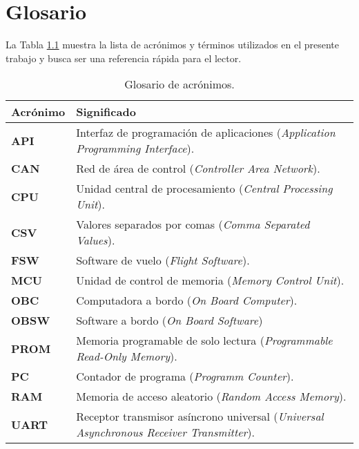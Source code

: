 
\chapter{Glosario} %
\label{AppendixA} %

La Tabla \ref{tab:glosario} muestra la lista de acrónimos y términos utilizados en el presente trabajo y busca ser una referencia rápida para el lector.


\begin{table}[h]
	\centering
	\caption[Tipos de emuladores]{Glosario de acrónimos.}
	\begin{tabular}{p{} p{}}
		\toprule
		\textbf{Acrónimo} & \textbf{Significado} \\
		\midrule
    \textbf{API} & Interfaz de programación de aplicaciones (\textit{Application Programming Interface}). \\
    \textbf{CAN} & Red de área de control (\textit{Controller Area Network}). \\
    \textbf{CPU} & Unidad central de procesamiento (\textit{Central Processing Unit}). \\
    \textbf{CSV} & Valores separados por comas (\textit{Comma Separated Values}). \\
    \textbf{FSW} & Software de vuelo (\textit{Flight Software}). \\
    \textbf{MCU} & Unidad de control de memoria (\textit{Memory Control Unit}). \\
    \textbf{OBC} & Computadora a bordo (\textit{On Board Computer}). \\
    \textbf{OBSW} & Software a bordo (\textit{On Board Software}) \\
    \textbf{PROM} & Memoria programable de solo lectura (\textit{Programmable Read-Only Memory}). \\
    \textbf{PC} & Contador de programa (\textit{Programm Counter}). \\
    \textbf{RAM} & Memoria de acceso aleatorio (\textit{Random Access Memory}). \\
    \textbf{UART} & Receptor transmisor asíncrono universal (\textit{Universal Asynchronous Receiver Transmitter}). \\
		\bottomrule
		\hline
	\end{tabular}
	\label{tab:glosario}
\end{table}
